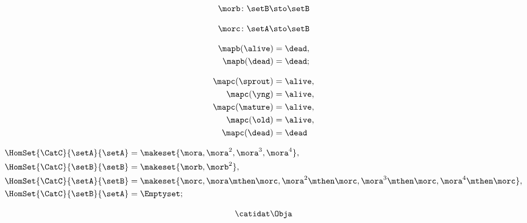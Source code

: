 \begin{forslides}
    \begin{equation}
        \label{eq:semicats-slides-82a}
        \morb \colon \setB \sto \setB
    \end{equation}

    \begin{equation}
        \label{eq:semicats-slides-82b}
        \morc \colon \setA \sto \setB
    \end{equation}

    \begin{equation}
        \label{eq:semicats-slides-83}
        \begin{aligned}
            \mapb(\alive) & =  \dead, \\
            \mapb(\dead)  & =  \dead;
        \end{aligned}
    \end{equation}

    \begin{equation}
        \label{eq:semicats-slides-84}
        \begin{aligned}
            \mapc(\sprout) & = \alive, \\
            \mapc(\yng)    & =  \alive, \\
            \mapc(\mature) & = \alive , \\
            \mapc( \old)   & = \alive, \\
            \mapc (\dead)  & = \dead
        \end{aligned}
    \end{equation}

    \begin{equation}
        \label{eq:semicats-slides-85}
        \begin{aligned}
            \HomSet{\CatC}{\setA}{\setA} & = \makeset{ \mora, \mora^2, \mora^3, \mora^4 }, \\
            \HomSet{\CatC}{\setB}{\setB} & =  \makeset{ \morb, \morb^2 }, \\
            \HomSet{\CatC}{\setA}{\setB} & =  \makeset{ \morc, \mora \mthen \morc, \mora^2 \mthen \morc, \mora^3 \mthen \morc, \mora^4 \mthen \morc}, \\
            \HomSet{\CatC}{\setB}{\setA} & = \Emptyset;
        \end{aligned}
    \end{equation}

    \begin{equation}
        \label{eq:semicats-slides-86}
        \catidat\Obja
    \end{equation}


\end{forslides}
